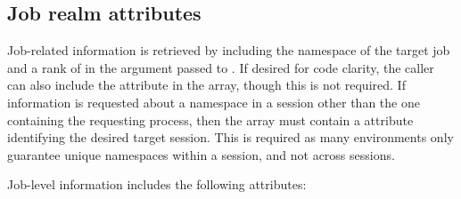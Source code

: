 \subsection{Job realm attributes}
\label{chap:res:jrealm}

Job-related information is retrieved by including the namespace of the target
job and a rank of  in the  argument
passed to . If desired for code clarity, the caller can also
include the  attribute in the  array,
though this is not required. If information is requested about a namespace in
a session other than the one containing the requesting process, then the
 array must contain a  attribute
identifying the desired target session. This is required as
many environments only guarantee unique namespaces within a session, and not
across sessions.

Job-level information includes the following attributes:

